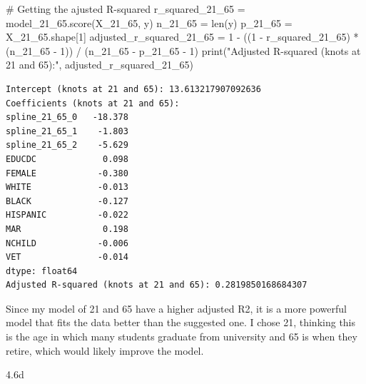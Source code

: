 \documentclass[
  11pt,
  letterpaper,
  DIV=11,
  numbers=noendperiod]{scrartcl}
\newenvironment{Shaded}{\begin{snugshade}}{\end{snugshade}}
\newcommand{\BuiltInTok}[1]{\textcolor[rgb]{0.00,0.23,0.31}{#1}}
\newcommand{\CommentTok}[1]{\textcolor[rgb]{0.37,0.37,0.37}{#1}}
\newcommand{\DecValTok}[1]{\textcolor[rgb]{0.68,0.00,0.00}{#1}}
\newcommand{\NormalTok}[1]{\textcolor[rgb]{0.00,0.23,0.31}{#1}}
\newcommand{\OperatorTok}[1]{\textcolor[rgb]{0.37,0.37,0.37}{#1}}
\newcommand{\StringTok}[1]{\textcolor[rgb]{0.13,0.47,0.30}{#1}}
\begin{document}
\begin{Shaded}
\begin{Highlighting}[]
\CommentTok{\# Getting the ajusted R{-}squared}
\NormalTok{r\_squared\_21\_65 }\OperatorTok{=}\NormalTok{ model\_21\_65.score(X\_21\_65, y)}
\NormalTok{n\_21\_65 }\OperatorTok{=} \BuiltInTok{len}\NormalTok{(y)}
\NormalTok{p\_21\_65 }\OperatorTok{=}\NormalTok{ X\_21\_65.shape[}\DecValTok{1}\NormalTok{]}
\NormalTok{adjusted\_r\_squared\_21\_65 }\OperatorTok{=} \DecValTok{1} \OperatorTok{{-}}\NormalTok{ ((}\DecValTok{1} \OperatorTok{{-}}\NormalTok{ r\_squared\_21\_65) }\OperatorTok{*}\NormalTok{ (n\_21\_65 }\OperatorTok{{-}} \DecValTok{1}\NormalTok{)) }\OperatorTok{/}\NormalTok{ (n\_21\_65 }\OperatorTok{{-}}\NormalTok{ p\_21\_65 }\OperatorTok{{-}} \DecValTok{1}\NormalTok{)}
\BuiltInTok{print}\NormalTok{(}\StringTok{"Adjusted R{-}squared (knots at 21 and 65):"}\NormalTok{, adjusted\_r\_squared\_21\_65)}
\end{Highlighting}
\end{Shaded}

\begin{verbatim}
Intercept (knots at 21 and 65): 13.613217907092636
Coefficients (knots at 21 and 65):
spline_21_65_0   -18.378
spline_21_65_1    -1.803
spline_21_65_2    -5.629
EDUCDC             0.098
FEMALE            -0.380
WHITE             -0.013
BLACK             -0.127
HISPANIC          -0.022
MAR                0.198
NCHILD            -0.006
VET               -0.014
dtype: float64
Adjusted R-squared (knots at 21 and 65): 0.2819850168684307
\end{verbatim}

Since my model of 21 and 65 have a higher adjusted R2, it is a more
powerful model that fits the data better than the suggested one. I chose
21, thinking this is the age in which many students graduate from
university and 65 is when they retire, which would likely improve the
model.

4.6d
\end{document}
